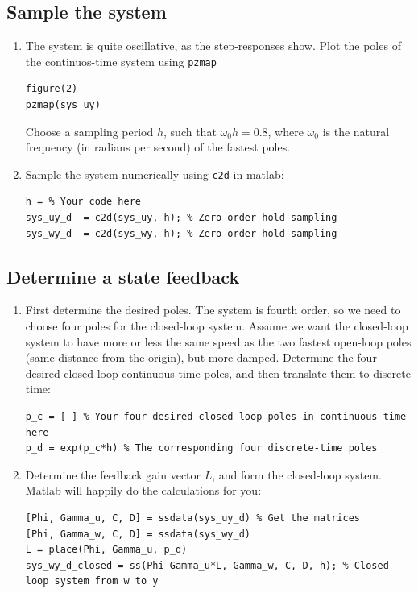 \documentclass[a4paper]{scrartcl}
\begin{document}
\subsection*{Sample the system}
\label{sec-2-3}
\begin{enumerate}
\item The system is quite oscillative, as the step-responses show. Plot the poles of the continuos-time system using \texttt{pzmap} 
\begin{verbatim}
figure(2)
pzmap(sys_uy)
\end{verbatim}
Choose a sampling period $h$, such that $\omega_0h = 0.8$, where $\omega_0$ is the natural frequency (in radians per second) of the fastest poles.
\item Sample the system numerically using \texttt{c2d} in matlab:
\begin{verbatim}
h = % Your code here
sys_uy_d  = c2d(sys_uy, h); % Zero-order-hold sampling
sys_wy_d  = c2d(sys_wy, h); % Zero-order-hold sampling
\end{verbatim}
\end{enumerate}

\subsection*{Determine a state feedback}
\label{sec-2-4}
\begin{enumerate}
\item First determine the desired poles. The system is fourth order, so we need to choose four poles for the closed-loop system. Assume we want the closed-loop system to have more or less the same speed as the two fastest open-loop poles (same distance from the origin), but more damped.  Determine the four desired closed-loop continuous-time poles, and then translate them to discrete time:
\begin{verbatim}
p_c = [ ] % Your four desired closed-loop poles in continuous-time here
p_d = exp(p_c*h) % The corresponding four discrete-time poles
\end{verbatim}
\item Determine the feedback gain vector \(L\), and form the closed-loop system. Matlab will happily do the calculations for you:
\begin{verbatim}
[Phi, Gamma_u, C, D] = ssdata(sys_uy_d) % Get the matrices
[Phi, Gamma_w, C, D] = ssdata(sys_wy_d) 
L = place(Phi, Gamma_u, p_d)    
sys_wy_d_closed = ss(Phi-Gamma_u*L, Gamma_w, C, D, h); % Closed-loop system from w to y
\end{verbatim}
\end{enumerate}
\end{document}
